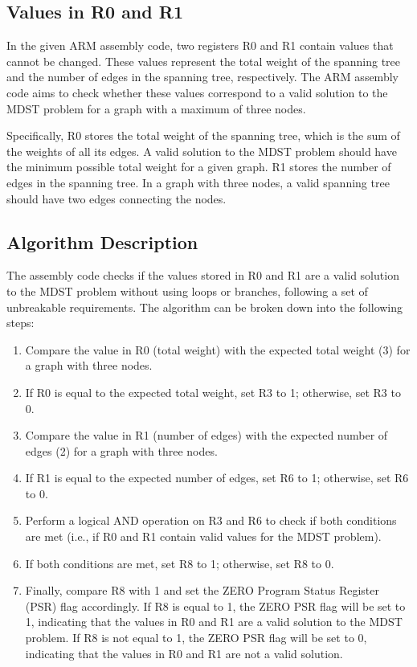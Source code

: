 \subsection{Values in R0 and R1}

In the given ARM assembly code, two registers R0 and R1 contain values that cannot be changed. These values represent the total weight of the spanning tree and the number of edges in the spanning tree, respectively. The ARM assembly code aims to check whether these values correspond to a valid solution to the MDST problem for a graph with a maximum of three nodes.

Specifically, R0 stores the total weight of the spanning tree, which is the sum of the weights of all its edges. A valid solution to the MDST problem should have the minimum possible total weight for a given graph. R1 stores the number of edges in the spanning tree. In a graph with three nodes, a valid spanning tree should have two edges connecting the nodes.

\subsection{Algorithm Description}

The assembly code checks if the values stored in R0 and R1 are a valid solution to the MDST problem without using loops or branches, following a set of unbreakable requirements. The algorithm can be broken down into the following steps:

\begin{enumerate}
  \item Compare the value in R0 (total weight) with the expected total weight (3) for a graph with three nodes.
  \item If R0 is equal to the expected total weight, set R3 to 1; otherwise, set R3 to 0.
  \item Compare the value in R1 (number of edges) with the expected number of edges (2) for a graph with three nodes.
  \item If R1 is equal to the expected number of edges, set R6 to 1; otherwise, set R6 to 0.
  \item Perform a logical AND operation on R3 and R6 to check if both conditions are met (i.e., if R0 and R1 contain valid values for the MDST problem).
  \item If both conditions are met, set R8 to 1; otherwise, set R8 to 0.
  \item Finally, compare R8 with 1 and set the ZERO Program Status Register (PSR) flag accordingly. If R8 is equal to 1, the ZERO PSR flag will be set to 1, indicating that the values in R0 and R1 are a valid solution to the MDST problem. If R8 is not equal to 1, the ZERO PSR flag will be set to 0, indicating that the values in R0 and R1 are not a valid solution.
\end{enumerate}


